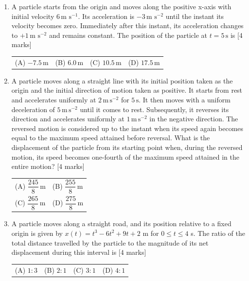 \documentclass[11pt,a4paper]{article}
\begin{document}
\begin{enumerate}[resume]
\item A particle starts from the origin and moves along the positive x-axis with initial velocity \(6\,\text{m s}^{-1}\). Its acceleration is \(-3\,\text{m s}^{-2}\) until the instant its velocity becomes zero. Immediately after this instant, its acceleration changes to \(+1\,\text{m s}^{-2}\) and remains constant. The position of the particle at \(t=5\,\text{s}\) is \hfill [4 marks]
{\renewcommand{\arraystretch}{1.8}
\begin{tabularx}{\linewidth}{X X X X}
(A) \quad \(-7.5\,\text{m}\) & (B) \quad \(6.0\,\text{m}\) & (C) \quad \(10.5\,\text{m}\) & (D) \quad \(17.5\,\text{m}\) \\[10pt]
\end{tabularx}}
\item A particle moves along a straight line with its initial position taken as the origin and the initial direction of motion taken as positive. It starts from rest and accelerates uniformly at $2\,\mathrm{m\,s^{-2}}$ for $5\,\mathrm{s}$. It then moves with a uniform deceleration of $5\,\mathrm{m\,s^{-2}}$ until it comes to rest. Subsequently, it reverses its direction and accelerates uniformly at $1\,\mathrm{m\,s^{-2}}$ in the negative direction. The reversed motion is considered up to the instant when its speed again becomes equal to the maximum speed attained before reversal. What is the displacement of the particle from its starting point when, during the reversed motion, its speed becomes one-fourth of the maximum speed attained in the entire motion? \hfill [4 marks]
{\renewcommand{\arraystretch}{1.8}
\begin{tabularx}{\linewidth}{X X}
(A) \quad $\dfrac{245}{8}\,\mathrm{m}$ & (B) \quad $\dfrac{255}{8}\,\mathrm{m}$ \\[10pt]
(C) \quad $\dfrac{265}{8}\,\mathrm{m}$ & (D) \quad $\dfrac{275}{8}\,\mathrm{m}$ \\[10pt]
\end{tabularx}}
\item A particle moves along a straight road, and its position relative to a fixed origin is given by $x(t)=t^3-6t^2+9t+2$ m for $0\leq t\leq 4$ s. The ratio of the total distance travelled by the particle to the magnitude of its net displacement during this interval is \hfill [4 marks]
{\renewcommand{\arraystretch}{1.8}
\begin{tabularx}{\linewidth}{X X X X}
(A) \quad $1:3$ & (B) \quad $2:1$ & (C) \quad $3:1$ & (D) \quad $4:1$ \\[10pt]
\end{tabularx}}

\end{enumerate}
\end{document}
